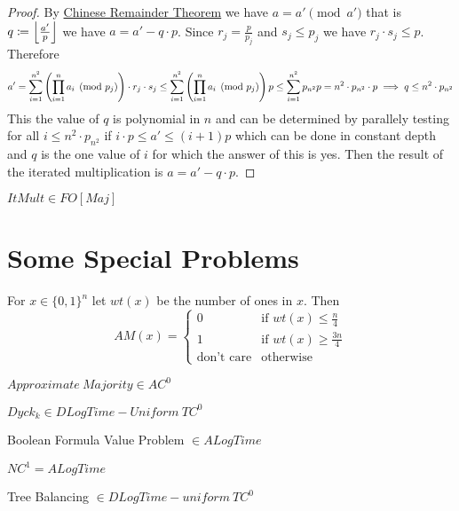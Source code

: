 \begin{proof}
	By \hyperref[crt]{Chinese Remainder Theorem} we have $a=a'\pmod{a'}$ that is $q\coloneqq \left\lfloor \frac{a'}{p}\right\rfloor$ we have $a=a'-q\cdot p$. Since $r_j=\frac{p}{p_j}$ and $s_j\leq p_j$ we have $r_j\cdot s_j\leq p$. Therefore $$a'= \sum_{i=1}^{n^2}\left( \prod\limits_{i=1}^n a_i\pmod{p_j} \right)\cdot r_j\cdot s_j\leq  \sum_{i=1}^{n^2}\left( \prod\limits_{i=1}^n a_i\pmod{p_j} \right)p\leq  \sum_{i=1}^{n^2}p_{n^2}p=n^2\cdot p_{n^2}\cdot p\implies q\leq n^2\cdot p_{n^2}$$ This the value of $q$ is  polynomial in $n$ and can be determined by parallely testing for all $i\leq n^2\cdot p_{n^2}$ if $i\cdot p\leq a'\leq (i+1)p$ which can be done in constant depth and $q$ is the one value of $i$ for which the answer of this is yes. Then the result of the iterated multiplication is $a=a'-q\cdot p$.
\end{proof}
\begin{theorem}
	$ItMult\in FO[Maj]$
\end{theorem}
\section{Some Special Problems}
\begin{definition}
	For $x\in \{0,1\}^n$ let $wt(x)$ be the number of ones in $x$.  Then $$AM(x)=\begin{cases}
		0                 & \text{if } wt(x)\leq \frac{n}{4} \\
		1                 & \text{if } wt(x)\geq \frac{3n}4  \\
		\text{don't care} & \text{otherwise}
	\end{cases}$$
\end{definition}
\begin{theorem}
	$Approximate\ Majority\in AC^0$
\end{theorem}

\begin{theorem}
	$Dyck_k\in DLogTime-Uniform\ TC^0$
\end{theorem}

\begin{theorem}
	Boolean Formula Value Problem $\in ALogTime$
\end{theorem}
\begin{corollary}
	$NC^1=ALogTime$
\end{corollary}
\begin{theorem}
	Tree Balancing $\in DLogTime-uniform\ TC^0$
\end{theorem}